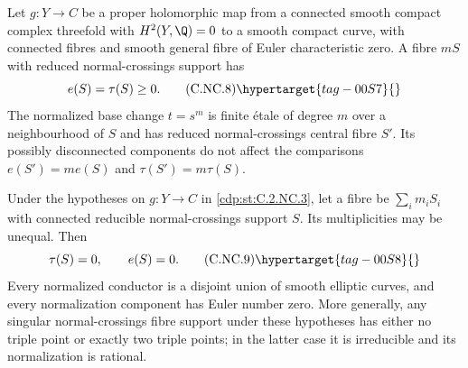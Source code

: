 \begin{proposition}\hypertarget{tag-01CA}{}\label{cdp:st:C.2.NC.3}


Let $g:Y\to C$ be a proper holomorphic map from a connected smooth compact complex threefold with $H^2(Y,\Q)=0$ to a smooth compact curve, with connected fibres and smooth general fibre of Euler characteristic zero. A fibre $mS$ with reduced normal-crossings support has
\[
 e(S)=\tau(S)\ge0.
 \tag{C.NC.8}\hypertarget{tag-00S7}{}\label{cdp:eq:C.NC.8}
\]
The normalized base change $t=s^m$ is finite étale of degree $m$ over a neighbourhood of $S$ and has reduced normal-crossings central fibre $S'$. Its possibly disconnected components do not affect the comparisons
$e(S')=m e(S)$ and $\tau(S')=m\tau(S)$.
\end{proposition}

\begin{proposition}\hypertarget{tag-01CB}{}\label{cdp:st:C.2.NC.4}


Under the hypotheses on $g:Y\to C$ in \ref{cdp:st:C.2.NC.3}, let a fibre be $\sum_i m_iS_i$ with connected reducible normal-crossings support $S$. Its multiplicities may be unequal. Then
\[
 \tau(S)=0,\qquad e(S)=0.
 \tag{C.NC.9}\hypertarget{tag-00S8}{}\label{cdp:eq:C.NC.9}
\]
Every normalized conductor is a disjoint union of smooth elliptic curves, and every normalization component has Euler number zero. More generally, any singular normal-crossings fibre support under these hypotheses has either no triple point or exactly two triple points; in the latter case it is irreducible and its normalization is rational.
\end{proposition}

